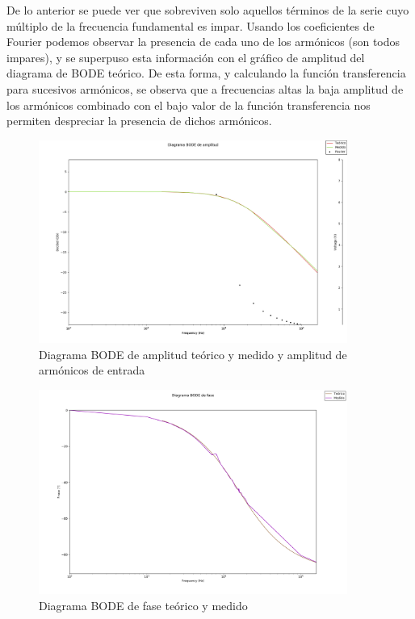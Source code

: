 De lo anterior se puede ver que sobreviven solo aquellos t\'erminos de la serie cuyo m\'ultiplo de la frecuencia fundamental es impar. Usando los coeficientes de Fourier podemos observar la presencia de cada uno de los arm\'onicos (son todos impares), y se superpuso esta informaci\'on con el gr\'afico de amplitud del diagrama de BODE teórico. De esta forma, y calculando la funci\'on transferencia para sucesivos arm\'onicos, se observa que a frecuencias altas la baja amplitud de los arm\'onicos combinado con el bajo valor de la funci\'on transferencia nos permiten despreciar la presencia de dichos arm\'onicos.


\begin{figure}[H]
    \centering
    \includegraphics[width=0.9\textwidth]{./EJ2/EJ2_BODE_teorico.png}
    \caption{Diagrama BODE de amplitud te\'orico y medido y amplitud de arm\'onicos de entrada}
    \label{fig:bode_amp_superp_2} 
\end{figure}

\begin{figure}[H]
    \centering
    \includegraphics[width=0.9\textwidth]{./EJ2/EJ2_fase_BODE.png}
    \caption{Diagrama BODE de fase te\'orico y medido}
    \label{fig:bode_phase_superp_2} 
\end{figure}

